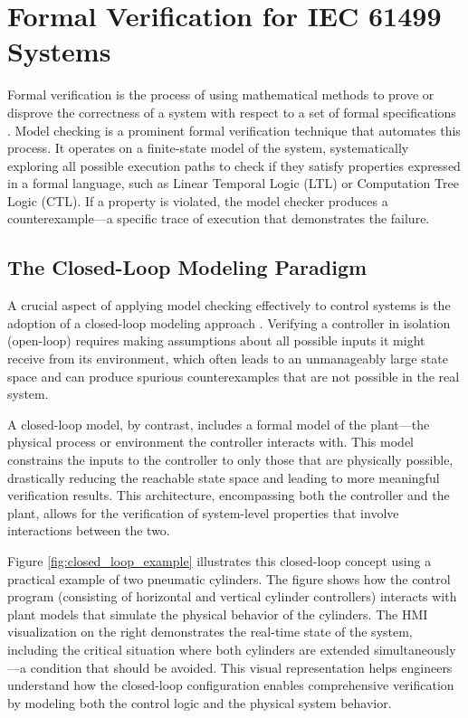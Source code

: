 \section{Formal Verification for IEC 61499 Systems}\label{sec:formal_verification}

Formal verification is the process of using mathematical methods to prove or disprove the correctness of a system with respect to a set of formal specifications \cite{clarke1986automatic}. Model checking is a prominent formal verification technique that automates this process. It operates on a finite-state model of the system, systematically exploring all possible execution paths to check if they satisfy properties expressed in a formal language, such as Linear Temporal Logic (LTL) or Computation Tree Logic (CTL). If a property is violated, the model checker produces a counterexample—a specific trace of execution that demonstrates the failure.

\subsection{The Closed-Loop Modeling Paradigm}

A crucial aspect of applying model checking effectively to control systems is the adoption of a closed-loop modeling approach \cite{vyatkin2008closed}. Verifying a controller in isolation (open-loop) requires making assumptions about all possible inputs it might receive from its environment, which often leads to an unmanageably large state space and can produce spurious counterexamples that are not possible in the real system.

A closed-loop model, by contrast, includes a formal model of the plant—the physical process or environment the controller interacts with. This model constrains the inputs to the controller to only those that are physically possible, drastically reducing the reachable state space and leading to more meaningful verification results. This architecture, encompassing both the controller and the plant, allows for the verification of system-level properties that involve interactions between the two.

Figure \ref{fig:closed_loop_example} illustrates this closed-loop concept using a practical example of two pneumatic cylinders. The figure shows how the control program (consisting of horizontal and vertical cylinder controllers) interacts with plant models that simulate the physical behavior of the cylinders. The HMI visualization on the right demonstrates the real-time state of the system, including the critical situation where both cylinders are extended simultaneously—a condition that should be avoided. This visual representation helps engineers understand how the closed-loop configuration enables comprehensive verification by modeling both the control logic and the physical system behavior.

